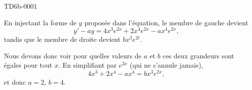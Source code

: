 
\begin{corrige}{TD6b-0001}

    En injectant la forme de \( y\) proposée dans l'équation, le membre de gauche devient
    \begin{equation}
        y'-ay=4x^3 e^{2x}+2x^4 e^{2x}-ax^4 e^{2x},
    \end{equation}
    tandis que le membre de droite devient \( bx^3 e^{2t}\).

    Nous devons donc voir pour quelles valeurs de \( a\) et \( b\) ces deux grandeurs sont égales pour tout \( x\). En simplifiant par \(  e^{2x}\) (qui ne s'annule jamais),
    \begin{equation}
        4x^3+2x^4-ax^4=bx^3 e^{2x},
    \end{equation}
    et donc \( a=2\), \( b=4\).

\end{corrige}

